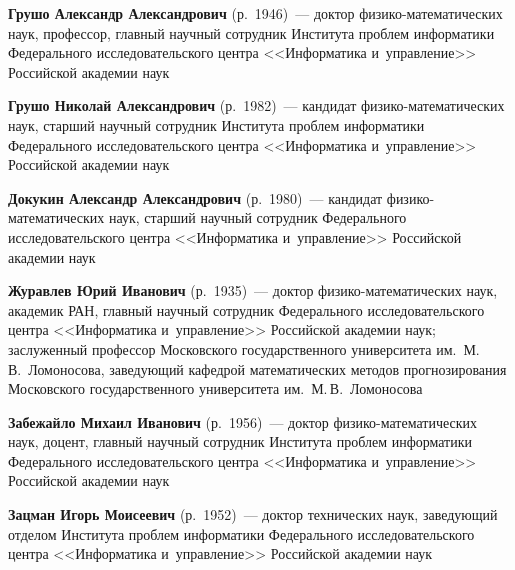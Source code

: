 \begin{multicols}{2}
\vspace*{2pt}


\noindent
\textbf{Грушо Александр Александрович} (р.\ 1946)~--- 
доктор фи\-зи\-ко-ма\-те\-ма\-ти\-че\-ских наук, 
профессор, главный научный сотрудник Института проб\-лем 
информатики Федерального исследовательского центра <<Информатика и~управ\-ле\-ние>> 
Российской академии наук

\columnbreak


\noindent
\textbf{Грушо Николай Александрович} (р.\ 1982)~--- 
кандидат фи\-зи\-ко-ма\-те\-ма\-ти\-че\-ских наук, старший научный 
сотрудник Института проб\-лем информатики Федерального 
исследовательского центра <<Информатика и~управ\-ле\-ние>> Российской академии наук

\vspace*{3pt}


\noindent
\textbf{Докукин Александр Александрович} (р.\ 1980)~--- кандидат фи\-зи\-ко-ма\-те\-ма\-ти\-че\-ских 
наук, старший научный сотрудник Федерального исследовательского центра 
<<Информатика и~управ\-ле\-ние>> Российской академии наук

\vspace*{3pt}


\noindent
\textbf{Журавлев Юрий Иванович} (р.\ 1935)~--- доктор фи\-зи\-ко-ма\-те\-ма\-ти\-че\-ских наук, 
академик РАН, главный научный сотрудник Федерального исследовательского центра 
<<Информатика и~управ\-ле\-ние>> Российской академии наук; 
заслуженный профессор Московского государственного университета им.\ М.\,В.~Ломоносова, 
заведующий кафедрой математических методов прогнозирования 
Московского государственного университета им.\ М.\,В.~Ломоносова



\vspace*{3pt}


\noindent
\textbf{Забежайло Михаил Иванович} (р.\ 1956)~--- 
доктор фи\-зи\-ко-ма\-те\-ма\-ти\-че\-ских наук, доцент, 
главный научный сотрудник Института проб\-лем информатики 
Федерального исследовательского центра <<Информатика и~управ\-ле\-ние>> 
Российской академии наук

\vspace*{3pt}


\noindent
\textbf{Зацман Игорь Моисеевич} (р.\ 1952)~--- 
доктор тех\-нических наук, заведующий отделом Института проб\-лем информатики 
Федерального исследовательского центра <<Информатика и~управ\-ле\-ние>> 
\mbox{Российской} академии наук


\end{multicols}
